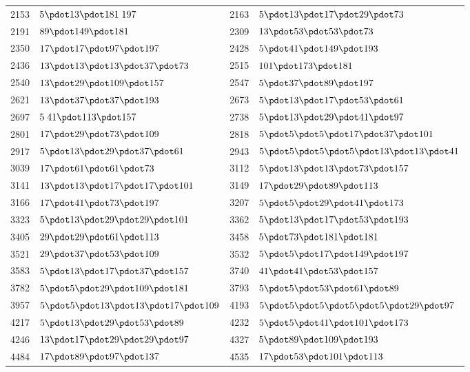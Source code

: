 \begin{longtable}{@{}r|l@{\qquad}r|l@{}}
2153 & $5\pdot 13\pdot 181\;197$ & 2163 & $5\pdot 13\pdot 17\pdot 29\pdot 73$\\
2191 & $89\pdot 149\pdot 181$ & 2309 & $13\pdot 53\pdot 53\pdot 73$\\
2350 & $17\pdot 17\pdot 97\pdot 197$ & 2428 & $5\pdot 41\pdot 149\pdot 193$\\
2436 & $13\pdot 13\pdot 13\pdot 37\pdot 73$ & 2515 & $101\pdot 173\pdot 181$\\
2540 & $13\pdot 29\pdot 109\pdot 157$ & 2547 & $5\pdot 37\pdot 89\pdot 197$\\
2621 & $13\pdot 37\pdot 37\pdot 193$ & 2673 & $5\pdot 13\pdot 17\pdot 53\pdot 61$\\
2697 & $5\;41\pdot 113\pdot 157$ & 2738 & $5\pdot 13\pdot 29\pdot 41\pdot 97$\\
2801 & $17\pdot 29\pdot 73\pdot 109$ & 2818 & $5\pdot 5\pdot 5\pdot 17\pdot 37\pdot 101$\\
2917 & $5\pdot 13\pdot 29\pdot 37\pdot 61$ & 2943 & $5\pdot 5\pdot 5\pdot 5\pdot 13\pdot 13\pdot 41$\\
3039 & $17\pdot 61\pdot 61\pdot 73$ & 3112 & $5\pdot 13\pdot 13\pdot 73\pdot 157$\\
3141 & $13\pdot 13\pdot 17\pdot 17\pdot 101$ & 3149 & $17\pdot 29\pdot 89\pdot 113$\\
3166 & $17\pdot 41\pdot 73\pdot 197$ & 3207 & $5\pdot 5\pdot 29\pdot 41\pdot 173$\\
3323 & $5\pdot 13\pdot 29\pdot 29\pdot 101$ & 3362 & $5\pdot 13\pdot 17\pdot 53\pdot 193$\\
3405 & $29\pdot 29\pdot 61\pdot 113$ & 3458 & $5\pdot 73\pdot 181\pdot 181$\\
3521 & $29\pdot 37\pdot 53\pdot 109$ & 3532 & $5\pdot 5\pdot 17\pdot 149\pdot 197$\\
3583 & $5\pdot 13\pdot 17\pdot 37\pdot 157$ & 3740 & $41\pdot 41\pdot 53\pdot 157$\\
3782 & $5\pdot 5\pdot 29\pdot 109\pdot 181$ & 3793 & $5\pdot 5\pdot 53\pdot 61\pdot 89$\\
3957 & $5\pdot 5\pdot 13\pdot 13\pdot 17\pdot 109$ & 4193 & $5\pdot 5\pdot 5\pdot 5\pdot 5\pdot 29\pdot 97$\\
4217 & $5\pdot 13\pdot 29\pdot 53\pdot 89$ & 4232 & $5\pdot 5\pdot 41\pdot 101\pdot 173$\\
4246 & $13\pdot 17\pdot 29\pdot 29\pdot 97$ & 4327 & $5\pdot 89\pdot 109\pdot 193$\\
4484 & $17\pdot 89\pdot 97\pdot 137$ & 4535 & $17\pdot 53\pdot 101\pdot 113$\\

\end{longtable}
